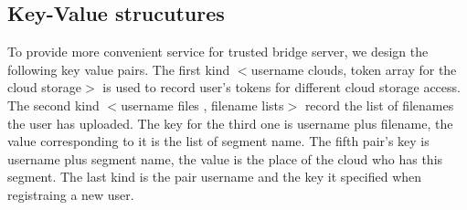 \subsection{Key-Value strucutures}
To provide more convenient service for trusted bridge server, 
we design the following key value pairs. 
The first kind $<$username clouds, token array for the cloud storage$>$ 
is used to record user's tokens for different cloud storage access. 
The second kind $<$username files , filename lists$>$ record the list 
of filenames the user has uploaded. 
The key for the third one is username plus filename,
the value corresponding to it is the list of segment name. 
The fifth pair's key is username plus segment name, 
the value is the place of the cloud who has this segment. 
The last kind is the pair username and the key it specified 
when registraing a new user. 
